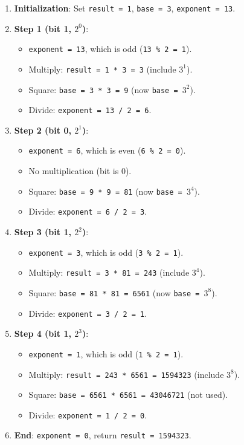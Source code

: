 \documentclass{article}
\begin{document}
    \begin{enumerate}
        \item \textbf{Initialization}: Set \texttt{result = 1}, \texttt{base = 3}, \texttt{exponent = 13}.
        \item \textbf{Step 1 (bit 1, \(2^0\))}:
        \begin{itemize}
            \item \texttt{exponent = 13}, which is odd (\texttt{13 \% 2 = 1}).
            \item Multiply: \texttt{result = 1 * 3 = 3} (include \(3^1\)).
            \item Square: \texttt{base = 3 * 3 = 9} (now \texttt{base = \(3^2\)}).
            \item Divide: \texttt{exponent = 13 / 2 = 6}.
        \end{itemize}
        \item \textbf{Step 2 (bit 0, \(2^1\))}:
        \begin{itemize}
            \item \texttt{exponent = 6}, which is even (\texttt{6 \% 2 = 0}).
            \item No multiplication (bit is 0).
            \item Square: \texttt{base = 9 * 9 = 81} (now \texttt{base = \(3^4\)}).
            \item Divide: \texttt{exponent = 6 / 2 = 3}.
        \end{itemize}
        \item \textbf{Step 3 (bit 1, \(2^2\))}:
        \begin{itemize}
            \item \texttt{exponent = 3}, which is odd (\texttt{3 \% 2 = 1}).
            \item Multiply: \texttt{result = 3 * 81 = 243} (include \(3^4\)).
            \item Square: \texttt{base = 81 * 81 = 6561} (now \texttt{base = \(3^8\)}).
            \item Divide: \texttt{exponent = 3 / 2 = 1}.
        \end{itemize}
        \item \textbf{Step 4 (bit 1, \(2^3\))}:
        \begin{itemize}
            \item \texttt{exponent = 1}, which is odd (\texttt{1 \% 2 = 1}).
            \item Multiply: \texttt{result = 243 * 6561 = 1594323} (include \(3^8\)).
            \item Square: \texttt{base = 6561 * 6561 = 43046721} (not used).
            \item Divide: \texttt{exponent = 1 / 2 = 0}.
        \end{itemize}
        \item \textbf{End}: \texttt{exponent = 0}, return \texttt{result = 1594323}.
    \end{enumerate}
\end{document}
